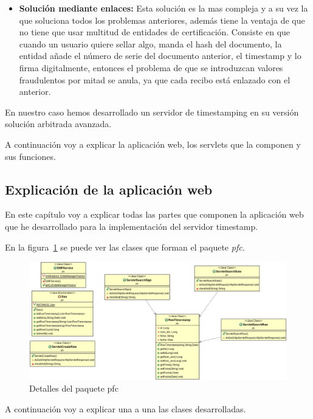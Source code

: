 \begin{itemize}
\item \textbf{Solución mediante enlaces:} Esta solución es la mas compleja y a su vez la que soluciona todos los problemas anteriores, además tiene la ventaja de que no tiene que usar multitud de entidades de certificación. Consiste en que cuando un usuario quiere sellar algo, manda el hash del documento, la entidad añade el número de serie del documento anterior, el timestamp y lo firma digitalmente, entonces el problema de que se introduzcan valores fraudulentos por mitad se anula, ya que cada recibo está enlazado con el anterior.
\end{itemize}

En nuestro caso hemos desarrollado un servidor de timestamping en su versión solución arbitrada avanzada.

A continuación voy a explicar la aplicación web, los servlets que la componen y sus funciones.

\subsection{Explicación de la aplicación web\label{ref_explicación_server_timestamp_google_app_engine}}
En este capítulo voy a explicar todas las partes que componen la aplicación web que he desarrollado para la implementación del servidor timestamp.

En la figura~\ref{fig:paquete_pfc} se puede ver las clases que forman el paquete \textit{pfc}.

\begin{figure}[gae]
  \centering
    \includegraphics[scale=0.5]{./GoogleAppEngine/imagenes/UML_pfc.png}
  \caption{Detalles del paquete pfc}
  \label{fig:paquete_pfc}
\end{figure}

A continuación voy a explicar una a una las clases desarrolladas.

